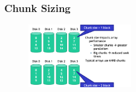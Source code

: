 \documentclass[10pt, oneside]{article}
\begin{document}
\subsubsection*{Chunk Sizing}
\begin{figure}[H]
    \begin{center}
    \includegraphics[width=0.4\textwidth]{img/img64.png}
    \end{center}
\end{figure}
\end{document}
